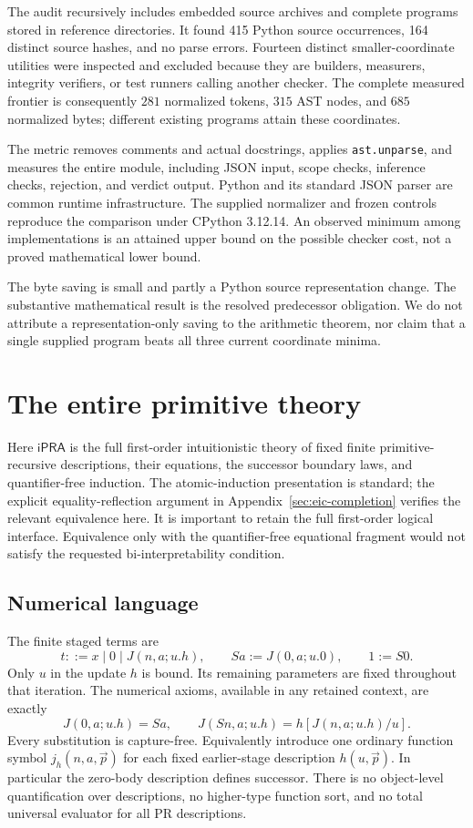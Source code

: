 \documentclass[11pt,letterpaper]{article}
\theoremstyle{definition}\newtheorem{definition}[theorem]{Definition}
\theoremstyle{remark}\newtheorem{remark}[theorem]{Remark}
\newcommand{\ipra}{\mathsf{iPRA}}
\begin{document}
The audit recursively includes embedded source archives and complete
programs stored in reference directories. It found 415 Python source
occurrences, 164 distinct source hashes, and no parse errors. Fourteen
distinct smaller-coordinate utilities were inspected and excluded because
they are builders, measurers, integrity verifiers, or test runners calling
another checker. The complete measured frontier is consequently
$281$ normalized tokens, $315$ AST nodes, and $685$ normalized bytes;
different existing programs attain these coordinates.

The metric removes comments and actual docstrings, applies
\texttt{ast.unparse}, and measures the entire module, including JSON input,
scope checks, inference checks, rejection, and verdict output. Python and
its standard JSON parser are common runtime infrastructure. The supplied
normalizer and frozen controls reproduce the comparison under CPython
3.12.14. An observed minimum among implementations is an attained upper
bound on the possible checker cost, not a proved mathematical lower bound.

The byte saving is small and partly a Python source representation change.
The substantive mathematical result is the resolved predecessor
obligation. We do not attribute a representation-only saving to the
arithmetic theorem, nor claim that a single supplied program beats all
three current coordinate minima.

\section{The entire primitive theory}
\label{sec:primitive}

Here $\ipra$ is the full first-order intuitionistic theory of fixed finite
primitive-recursive descriptions, their equations, the successor boundary
laws, and quantifier-free induction. The atomic-induction presentation is
standard\cite{salehi}; the explicit equality-reflection argument in
Appendix~\ref{sec:eic-completion} verifies the relevant equivalence here.
It is important to retain the full first-order logical interface.
Equivalence only with the quantifier-free equational fragment would not
satisfy the requested bi-interpretability condition.

\subsection{Numerical language}
The finite staged terms are
\[
 t::=x\mid0\mid J(n,a;u.h),\qquad Sa:=J(0,a;u.0),\qquad1:=S0.
\]
Only $u$ in the update $h$ is bound. Its remaining parameters are fixed
throughout that iteration. The numerical axioms, available in any retained
context, are exactly
\[
 J(0,a;u.h)=Sa,\qquad
 J(Sn,a;u.h)=h[J(n,a;u.h)/u].\tag{J0, JS}
\]
Every substitution is capture-free. Equivalently introduce one ordinary
function symbol $j_h(n,a,\vec p)$ for each fixed earlier-stage description
$h(u,\vec p)$. In particular the zero-body description defines successor.
There is no object-level quantification over descriptions, no higher-type
function sort, and no total universal evaluator for all PR descriptions.
\end{document}
